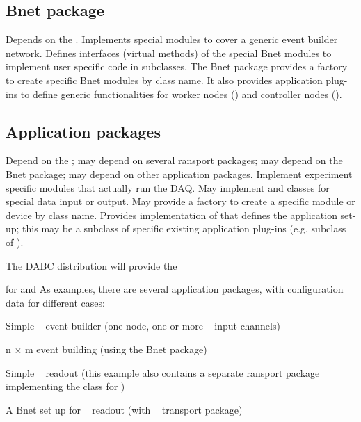 \subsection{Bnet package}
   Depends on the . Implements special 
   modules to cover a generic event builder network. 
   Defines interfaces (virtual methods) of the special Bnet modules to 
   implement user specific code in subclasses. The Bnet package provides a 
   factory to create specific Bnet modules by class name. It also 
   provides application plug-ins to define generic functionalities for 
   worker nodes () and 
   controller nodes ().    
\subsection{Application packages}
   Depend on the ; may depend 
   on several ransport packages; may depend on the Bnet package; may 
   depend on other application packages. Implement experiment specific 
   modules that actually run the DAQ. May implement  
   and  classes for special data input or output. May provide 
   a factory to create a specific module or device by class name. 
   Provides implementation of  that defines the 
   application set-up; this may be a subclass of specific existing 
   application plug-ins (e.g. subclass of ). 

The DABC distribution will provide the 
\bbul
\item {}
\item {} 
\item {} 
\item {} 
\item {} for  and  
\ebul
As examples, there are several application packages, with configuration data for different cases:
\bbul
\item  Simple \mbs~ event builder (one node, one or more \mbs~ input channels)
\item  \strong{\mbs} n $\times$ m event building (using the Bnet package)
\item  Simple \ABB~ readout (this example also contains 
   a separate ransport package implementing the  class for \ABB)
\item  A Bnet set up for \ABB~ readout (with \ABB~ transport package)
\ebul

